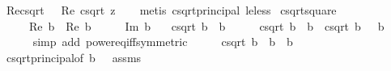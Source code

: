 \begin{isabellebody}
\endisatagproof
{\isafoldproof}%
%
\isadelimproof
\isanewline
%
\endisadelimproof
\isanewline
{}\isamarkupfalse%
\ Re{\isacharunderscore}{\kern0pt}csqrt{\isacharcolon}{\kern0pt}\ {\isachardoublequoteopen}{}\ {\isasymle}\ Re\ {\isacharparenleft}{\kern0pt}csqrt\ z{\isacharparenright}{\kern0pt}{\isachardoublequoteclose}\isanewline
%
\isadelimproof
\ \ %
\endisadelimproof
%
\isatagproof
{}\isamarkupfalse%
\ {\isacharparenleft}{\kern0pt}metis\ csqrt{\isacharunderscore}{\kern0pt}principal\ le{\isacharunderscore}{\kern0pt}less{\isacharparenright}{\kern0pt}%
\endisatagproof
{\isafoldproof}%
%
\isadelimproof
\isanewline
%
\endisadelimproof
\isanewline
{}\isamarkupfalse%
\ csqrt{\isacharunderscore}{\kern0pt}square{\isacharcolon}{\kern0pt}\isanewline
\ \ \ {\isachardoublequoteopen}{}\ {\isacharless}{\kern0pt}\ Re\ b\ {\isasymor}\ {\isacharparenleft}{\kern0pt}Re\ b\ {\isacharequal}{\kern0pt}\ {}\ {\isasymand}\ {}\ {\isasymle}\ Im\ b{\isacharparenright}{\kern0pt}{\isachardoublequoteclose}\isanewline
\ \ \ {\isachardoublequoteopen}csqrt\ {\isacharparenleft}{\kern0pt}b{\isacharcircum}{\kern0pt}{}{\isacharparenright}{\kern0pt}\ {\isacharequal}{\kern0pt}\ b{\isachardoublequoteclose}\isanewline
%
\isadelimproof
%
\endisadelimproof
%
\isatagproof
{}\isamarkupfalse%
\ {\isacharminus}{\kern0pt}\isanewline
\ \ \isamarkupfalse%
\ {\isachardoublequoteopen}csqrt\ {\isacharparenleft}{\kern0pt}b{\isacharcircum}{\kern0pt}{}{\isacharparenright}{\kern0pt}\ {\isacharequal}{\kern0pt}\ b\ {\isasymor}\ csqrt\ {\isacharparenleft}{\kern0pt}b{\isacharcircum}{\kern0pt}{}{\isacharparenright}{\kern0pt}\ {\isacharequal}{\kern0pt}\ {\isacharminus}{\kern0pt}\ b{\isachardoublequoteclose}\isanewline
\ \ \ \ \isamarkupfalse%
\ {\isacharparenleft}{\kern0pt}simp\ add{\isacharcolon}{\kern0pt}\ power{}{\isacharunderscore}{\kern0pt}eq{\isacharunderscore}{\kern0pt}iff{\isacharbrackleft}{\kern0pt}symmetric{\isacharbrackright}{\kern0pt}{\isacharparenright}{\kern0pt}\isanewline
\ \ \isamarkupfalse%
\ \isamarkupfalse%
\ {\isachardoublequoteopen}csqrt\ {\isacharparenleft}{\kern0pt}b{\isacharcircum}{\kern0pt}{}{\isacharparenright}{\kern0pt}\ {\isasymnoteq}\ {\isacharminus}{\kern0pt}b\ {\isasymor}\ b\ {\isacharequal}{\kern0pt}\ {}{\isachardoublequoteclose}\isanewline
\ \ \ \ \isamarkupfalse%
\ csqrt{\isacharunderscore}{\kern0pt}principal{\isacharbrackleft}{\kern0pt}of\ {\isachardoublequoteopen}b\ {\isacharcircum}{\kern0pt}\ {}{\isachardoublequoteclose}{\isacharbrackright}{\kern0pt}\ assms\isanewline

\end{isabellebody}
